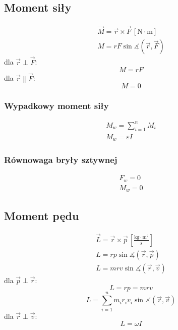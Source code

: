 \documentclass{article}
\numberwithin{equation}{section}
\newcommand{\unit}[1]{\, \left[\mathrm{#1}\right]}
\begin{document}
    \subsection{Moment siły}
      \begin{gather}
        \vec M = \vec r\times\vec F \unit{N\cdot m}\\
        M = rF\sin\measuredangle (\vec r, \vec F)
      \end{gather}
      dla $\vec r \perp \vec F$:
      \begin{equation}
        M = rF
      \end{equation}
      dla $\vec r \parallel \vec F$:
      \begin{equation}
        M = 0
      \end{equation}
      \subsubsection{Wypadkowy moment siły}
        \begin{gather}
          M_w = \sum_{i=1}^n M_i\\
          M_w = \varepsilon I
        \end{gather}
      \subsubsection{Równowaga bryły sztywnej}
        \begin{gather}
          F_w = 0\\
          M_w = 0
        \end{gather}
    \subsection{Moment pędu}
      \begin{gather}
        \vec L = \vec r \times\vec p \unit{\frac{kg\cdot m^2}{s}}\\
        L = rp\sin\measuredangle (\vec r,\vec p)\\
        L = mrv\sin\measuredangle (\vec r,\vec v)
      \end{gather}
      dla $\vec p \perp \vec r$:
      \begin{equation}
        L = rp = mrv
      \end{equation}
      \begin{equation}
        L = \sum_{i=1}^n m_ir_iv_i\sin\measuredangle (\vec r,\vec v)
      \end{equation}
      dla $\vec r \perp \vec v$:
      \begin{equation}
        L = \omega I
      \end{equation}
\end{document}
